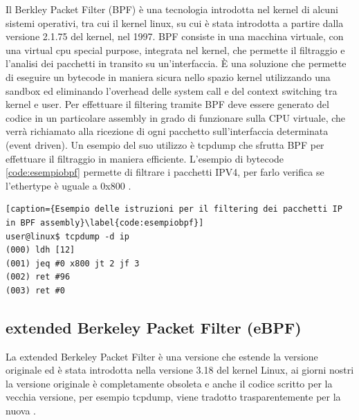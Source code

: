 Il Berkley Packet Filter (BPF) è una tecnologia introdotta nel kernel di alcuni sistemi operativi, tra cui il kernel linux, su cui è stata introdotta a partire dalla versione 2.1.75 del kernel, nel 1997. BPF consiste in una macchina virtuale, con una virtual cpu special purpose, integrata nel kernel, che permette il filtraggio e l'analisi dei pacchetti in transito su un'interfaccia.
È una soluzione che permette di eseguire un bytecode in maniera sicura nello spazio kernel utilizzando una sandbox ed eliminando l'overhead delle system call e del context switching tra kernel e user. 
Per effettuare il filtering tramite BPF deve essere generato del codice in un particolare assembly in grado di funzionare sulla CPU virtuale, che verrà richiamato alla ricezione di ogni pacchetto sull'interfaccia determinata (event driven). 
Un esempio del suo utilizzo è tcpdump che sfrutta BPF per effettuare il filtraggio in maniera efficiente. L'esempio di bytecode \ref{code:esempiobpf} permette di filtrare i pacchetti IPV4, per farlo verifica se l'ethertype è uguale a 0x800 \cite{risso_ebpf}.



\begin{lstlisting}[caption={Esempio delle istruzioni per il filtering dei pacchetti IP in BPF assembly}\label{code:esempiobpf}]
user@linux$ tcpdump -d ip
(000) ldh [12]
(001) jeq #0 x800 jt 2 jf 3
(002) ret #96
(003) ret #0
\end{lstlisting}

\subsection{extended Berkeley Packet Filter (eBPF)}

La extended Berkeley Packet Filter è una versione che estende la versione originale ed è stata introdotta nella versione 3.18 del kernel Linux, ai giorni nostri la versione originale è completamente obsoleta e anche il codice scritto per la vecchia versione, per esempio tcpdump, viene tradotto trasparentemente per la nuova \cite{cilium_ebpf}.

